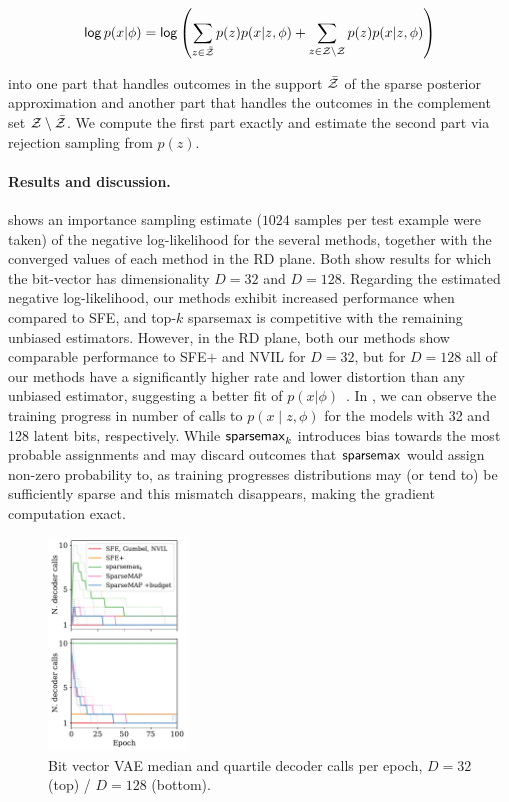 \begin{equation}
    \operatorname*{\mathsf{log}} p(x|\phi) = \operatorname*{\mathsf{log}} \left( \sum_{z \in \bar {\mathcal{Z}}}
    p(z)p(x|z, \phi) + \sum_{z \in \mathcal{Z} \setminus \mathcal{Z}} p(z)p(x|z, \phi)
    \right)
\end{equation}

into one part that handles outcomes in the support $\bar {\mathcal{Z}}$ of the
sparse posterior approximation and another part that handles the
outcomes in the complement set $\mathcal{Z} \setminus \bar {\mathcal{Z}}$. We compute
the first part exactly and estimate the second part via rejection
sampling from $p(z)$.

\paragraph*{Results and discussion.}  shows an
importance sampling estimate ($1024$ samples per test example were
taken) of the negative log-likelihood for the several methods,
together with the converged values of each method in the RD plane.
Both show results for which the bit-vector has dimensionality $D=32$
and $D=128$. Regarding the estimated negative log-likelihood, our
methods exhibit increased performance when compared to SFE, and
top-$k$ sparsemax is competitive with the remaining unbiased
estimators. However, in the RD plane, both our methods show
comparable performance to SFE$+$ and NVIL for $D=32$, but for $D=128$
all of our methods have a significantly higher rate and lower
distortion than any unbiased estimator, suggesting a better fit of
$p(x|\phi)$~\citep{Alemi2018}. In , we can observe the training
progress in number of calls to $p(x \mid z, \phi)$ for the models
with 32 and 128 latent bits, respectively. While $\operatorname{\mathsf{sparsemax}_\text{$k$}}$
introduces bias towards the most probable assignments and may discard
outcomes that $\operatorname*{\mathsf{sparsemax}}$ would assign non-zero probability to, as
training progresses distributions may (or tend to) be sufficiently
sparse and this mismatch disappears, making the gradient computation
exact.

\begin{figure}[htbp]
    \centering
    \includegraphics[width=0.33\textwidth]{Figures/spars.pdf}
    \caption{Bit vector VAE median and quartile decoder calls per
        epoch,
        $D=32$ (top) / $D=128$ (bottom).\label{fig:structcalls}}
\end{figure}

